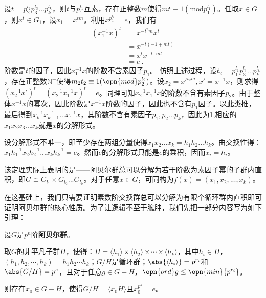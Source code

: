 设$t=p_2^{l_2}p_3^{l_3}...p_k^{l_k}$，则$t$与$p_1^{l_1}$互素，存在正整数$m$使得$mt\equiv 1(\mathrm {mod} p_1^{l_1})$。任取$x\in G$，则$x^t\in G_1$，设$x_1=x^{tm}$。利用$x^{p_1^{l_1}}=e$，我们有
\begin{equation}
\begin{aligned}
(x_1^{-1}x)^t&=x^{-t^2m}x^t\\
&=x^{-t(-1+mt)}\\
&=x^tx^{-t\cdot mt}\\
&=e~.
\end{aligned}
\end{equation}
阶数是$t$的因子，因此$x_1^{-1}x$的阶数不含素因子$p_1$。
仿照上述过程，设$t_2=p_1^{l_1}p_3^{l_3}...p_k^{l_k}$，存在正整数$\mathbb N^{+}$使得$m_2t_2\equiv 1(\opn{mod}p_2^{l_2})$。设$x_2=x'^{t_2m},x'=x^{-1}x$，则求得$(x_2^{-1}x')^t=(x_2^{-1}x_1^{-1}x)^t=e$。同理可知$x_2^{-1}x_1^{-1}x$的阶数不含有素因子$p_2$。由于整体$x^{-1}x$的幂次，因此阶数是$x^{-1}x$阶数的因子，因此也不含有$p_1$因子。以此类推，最后得到$x_k^{-1}x_{k-1}^{-1}...x_1^{-1}x$，其阶数不含有素因子$p_1,p_2...p_k$，因此为1,相应的$x_1x_2x_3...x_k$就是$x$的分解形式。

设分解形式不唯一，即至少存在两组分量使得$x_1x_2...x_k=h_1h_2...h_k$。由交换性得：$x_1h_1^{-1}x_2h_2^{-1}...x_kh_k^{-1}=e$。然而$e$的分解形式只能是$e$的乘积，因而$x_i=h_i$。

该定理实际上表明的是——阿贝尔群总可以分解为若干阶数为素因子幂的子群内直积，即$G\cong G_{l_1}\times G_{l_2}...G_{l_k}$。对于任意$x\in G$，可同构为$f(x)=(x_1,x_2,...,x_k)$。

在这基础上，我们只需要证明素数阶交换群总可以分解为有限个循环群内直积即可证明阿贝尔群的核心性质。为了让逻辑不至于臃肿，我们先把一部分内容写为如下引理：



\begin{lemma}{}\label{lem_Albert_1}

设$G$是$p^n$阶\textbf{阿贝尔群}。

取$G$的非平凡子群$H$，使得：$H=\langle h_1 \rangle\times\langle h_2 \rangle\times\cdots\times\langle h_k \rangle$，其中$h_i\in H$，$(h_1, h_2, \cdots, h_k)=h_1h_2\cdots h_k$；$G/H$是循环群；$\abs{\langle h_i \rangle}=p^{r_i}$和$\abs{G/H}=p^s$，且对于任意$g\in G-H$，$\opn{ord}g\leq \opn{min}\{p^{r_i}\}$。

则存在$x_0\in G-H$，使得$G/H=\langle x_0H \rangle$且$x_0^{p^s}=e$。

\end{lemma}

